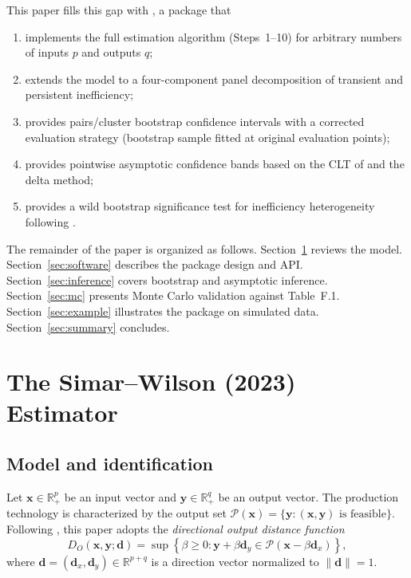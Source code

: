 \documentclass[article]{jss}
\begin{document}
This paper fills this gap with , a  package that
\begin{enumerate}
  \item implements the full \citet{SimarWilson2023} estimation algorithm
        (Steps~1--10) for arbitrary numbers of inputs $p$ and outputs $q$;
  \item extends the model to a four-component panel decomposition of
        transient and persistent inefficiency;
  \item provides pairs/cluster bootstrap confidence intervals with a
        corrected evaluation strategy (bootstrap sample fitted at original
        evaluation points);
  \item provides pointwise asymptotic confidence bands based on the CLT
        of \citet{SimarWilson2023} and the delta method;
  \item provides a wild bootstrap significance test for inefficiency
        heterogeneity following \citet{PSVKZ2024}.
\end{enumerate}

The remainder of the paper is organized as follows.
Section~\ref{sec:method} reviews the \citet{SimarWilson2023} model.
Section~\ref{sec:software} describes the package design and API.
Section~\ref{sec:inference} covers bootstrap and asymptotic inference.
Section~\ref{sec:mc} presents Monte Carlo validation against
\citet{SimarWilson2023} Table~F.1.
Section~\ref{sec:example} illustrates the package on simulated data.
Section~\ref{sec:summary} concludes.



\section[The Simar--Wilson (2023) estimator]{The Simar--Wilson (2023) Estimator}
\label{sec:method}

\subsection{Model and identification}
\label{sec:model}

Let $\mathbf{x} \in \mathbb{R}^p_+$ be an input vector and
$\mathbf{y} \in \mathbb{R}^q_+$ be an output vector.
The production technology is characterized by the output set
$\mathcal{P}(\mathbf{x}) = \{\mathbf{y} : (\mathbf{x},\mathbf{y})
\text{ is feasible}\}$.  Following \citet{SimarWilson2023}, this paper adopts
the \emph{directional output distance function}
%
\begin{equation}
  D_O(\mathbf{x},\mathbf{y};\mathbf{d})
  = \sup\!\left\{\beta \geq 0 : \mathbf{y}+\beta\mathbf{d}_y
                                \in \mathcal{P}(\mathbf{x}-\beta\mathbf{d}_x)
               \right\},
\end{equation}
%
where $\mathbf{d} = (\mathbf{d}_x,\mathbf{d}_y) \in \mathbb{R}^{p+q}$ is
a direction vector normalized to $\|\mathbf{d}\|=1$.
\end{document}
